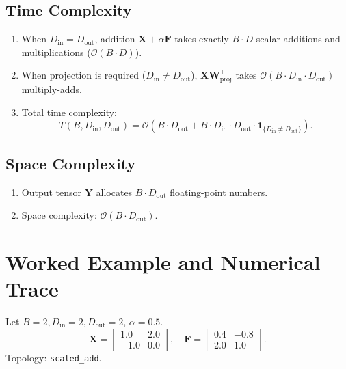 \documentclass[11pt]{article}
\begin{document}
\subsection{Time Complexity}
\begin{enumerate}
    \item When $D_{\text{in}} = D_{\text{out}}$, addition $\mathbf{X} + \alpha \mathbf{F}$ takes exactly $B \cdot D$ scalar additions and multiplications ($\mathcal{O}(B \cdot D)$).
    \item When projection is required ($D_{\text{in}} \ne D_{\text{out}}$), $\mathbf{X} \mathbf{W}_{\text{proj}}^\top$ takes $\mathcal{O}(B \cdot D_{\text{in}} \cdot D_{\text{out}})$ multiply-adds.
    \item Total time complexity:
    \begin{equation}
    T(B, D_{\text{in}}, D_{\text{out}}) = \mathcal{O}(B \cdot D_{\text{out}} + B \cdot D_{\text{in}} \cdot D_{\text{out}} \cdot \mathbf{1}_{\{D_{\text{in}} \ne D_{\text{out}}\}}).
    \end{equation}
\end{enumerate}

\subsection{Space Complexity}
\begin{enumerate}
    \item Output tensor $\mathbf{Y}$ allocates $B \cdot D_{\text{out}}$ floating-point numbers.
    \item Space complexity: $\mathcal{O}(B \cdot D_{\text{out}})$.
\end{enumerate}

\section{Worked Example and Numerical Trace}
\label{sec:worked_example}

Let $B = 2, D_{\text{in}} = 2, D_{\text{out}} = 2$, $\alpha = 0.5$.
\begin{equation}
\mathbf{X} = \begin{bmatrix} 1.0 & 2.0 \\ -1.0 & 0.0 \end{bmatrix}, \quad
\mathbf{F} = \begin{bmatrix} 0.4 & -0.8 \\ 2.0 & 1.0 \end{bmatrix}.
\end{equation}
Topology: \texttt{scaled\_add}.
\end{document}
